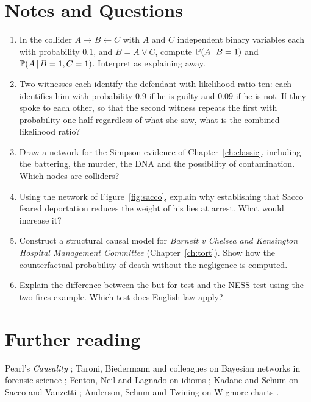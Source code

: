 \section*{Notes and Questions}
\begin{enumerate}[label=\arabic*.]
\item In the collider $A \to B \leftarrow C$ with $A$ and $C$ independent binary variables each with probability $0.1$, and $B = A \lor C$, compute $\mathbb{P}(A \,\vert\, B = 1)$ and $\mathbb{P}(A\,\vert\, B = 1, C = 1)$. Interpret as explaining away.
\item Two witnesses each identify the defendant with likelihood ratio ten: each identifies him with probability 0.9 if he is guilty and 0.09 if he is not. If they spoke to each other, so that the second witness repeats the first with probability one half regardless of what she saw, what is the combined likelihood ratio?
\item Draw a network for the Simpson evidence of Chapter~\ref{ch:classic}, including the battering, the murder, the DNA and the possibility of contamination. Which nodes are colliders?
\item Using the network of Figure~\ref{fig:sacco}, explain why establishing that Sacco feared deportation reduces the weight of his lies at arrest. What would increase it?
\item Construct a structural causal model for \emph{Barnett v Chelsea and Kensington Hospital Management Committee} (Chapter~\ref{ch:tort}). Show how the counterfactual probability of death without the negligence is computed.
\item Explain the difference between the but for test and the NESS test using the two fires example. Which test does English law apply?
\end{enumerate}

\section*{Further reading}
Pearl's \emph{Causality} \citep{pearl2009}; Taroni, Biedermann and colleagues on Bayesian networks in forensic science \citep{taroni2014}; Fenton, Neil and Lagnado on idioms \citep{fenton2013}; Kadane and Schum on Sacco and Vanzetti \citep{kadane_schum1996}; Anderson, Schum and Twining on Wigmore charts \citep{anderson2005}.
